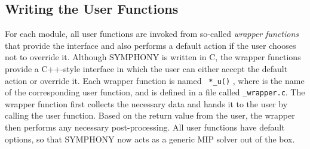 \subsection{Writing the User Functions}

For each module, all user functions are invoked from so-called \emph{wrapper
functions} that provide the interface and also performs a default action if
the user chooses not to override it. Although SYMPHONY is written in C, the
wrapper functions provide a C++-style interface in which the user can either
accept the default action or override it. Each wrapper function is named {\tt
*\_u()} , where {\tt *} is the name of the corresponding user function, and is
defined in a file called {\tt *\_wrapper.c}. The wrapper function first
collects the necessary data and hands it to the user by calling the user
function. Based on the return value from the user, the wrapper then performs
any necessary post-processing. All user functions have default options, so
that SYMPHONY now acts as a generic MIP solver out of the box.

